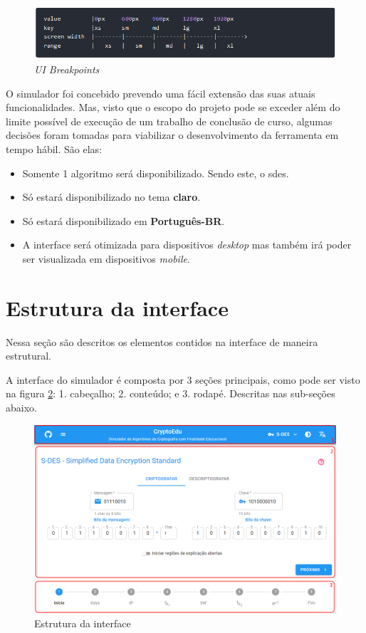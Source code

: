 \begin{figure}[H]
    \centering
    \caption{\textit{UI Breakpoints}}
    \label{fig:muibreakpoints}
    \includegraphics[width=0.85\linewidth]{UI/MuiBreakpoints.png}
\end{figure}

O simulador foi concebido prevendo uma fácil extensão das suas atuais funcionalidades. Mas, visto que o escopo do projeto pode se exceder além do limite possível de execução de um trabalho de conclusão de curso, algumas decisões foram tomadas para viabilizar o desenvolvimento da ferramenta em tempo hábil. São elas:

\begin{itemize}
    \item Somente 1 algoritmo será disponibilizado. Sendo este, o \acrfull{sdes}.
    \item Só estará disponibilizado no tema \textbf{claro}.
    \item Só estará disponibilizado em \textbf{Português-BR}.
    \item A interface será otimizada para dispositivos \textit{desktop} mas também irá poder ser visualizada em dispositivos \textit{mobile}.
\end{itemize}

\section{Estrutura da interface}
Nessa seção são descritos os elementos contidos na interface de maneira estrutural.

A interface do simulador é composta por 3 seções principais, como pode ser visto na figura \ref{fig:uiestrutura}: 1. cabeçalho; 2. conteúdo; e 3. rodapé. Descritas nas sub-seções abaixo.

\begin{figure}[H]
    \centering
    \caption{Estrutura da interface}
    \label{fig:uiestrutura}
    \includegraphics[width=1\linewidth]{UI/UIEstrutura.png}
\end{figure}

